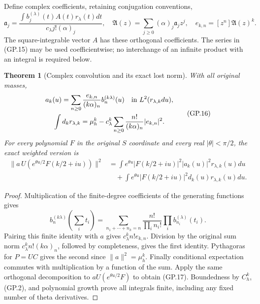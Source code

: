 \documentclass[11pt]{article}
\newtheorem{theorem}{Theorem}
\begin{document}
Define complex coefficients, retaining conjugation conventions,
\begin{equation}
 \mathfrak a_j=\frac{\int b_j^{(\lambda)}(t)A(t)r_\lambda(t)dt}
                         {c_\lambda j!(\alpha)_j},\quad
 \mathfrak A(z)=\sum_{j\geq0}(\alpha)_j\mathfrak a_jz^j,\quad
 e_{k,n}=[z^n]\mathfrak A(z)^k.
 \tag{GP.15}
\end{equation}
The square-integrable vector $A$ has these orthogonal coefficients.
The series in (GP.15) may be used coefficientwise; no interchange of
an infinite product with an integral is required below.
\begin{theorem}[Complex convolution and its exact lost norm]
With all original masses,
\begin{equation}
 \begin{gathered}
 a_k(u)=\sum_{n\geq0}\frac{e_{k,n}}{(k\alpha)_n}b_n^{(k\lambda)}(u)
       \quad\hbox{in }L^2(r_{\lambda,k}du),\\
 \int d_k r_{\lambda,k}
  =\mu_h^k-c_\lambda^k\sum_{n\geq0}
                         \frac{n!}{(k\alpha)_n}|e_{k,n}|^2.
 \end{gathered}
 \tag{GP.16}
\end{equation}
For every polynomial $F$ in the original $S$ coordinate and every
real $|\theta|<\pi/2$, the exact weighted version is
\begin{equation}
 \begin{aligned}
 \|a\,U(e^{\theta u/2}F(k/2+iu))\|^2
 &=\int e^{\theta u}|F(k/2+iu)|^2|a_k(u)|^2r_{\lambda,k}(u)du\\
 &\quad+\int e^{\theta u}|F(k/2+iu)|^2d_k(u)r_{\lambda,k}(u)du.
 \end{aligned}
 \tag{GP.17}
\end{equation}
\end{theorem}
\begin{proof}
Multiplication of the finite-degree coefficients of the generating
functions gives
\[
 b_n^{(k\lambda)}(\textstyle\sum_i t_i)
 =\sum_{n_1+\cdots+n_k=n}\frac{n!}{\prod_i n_i!}
                                \prod_i b_{n_i}^{(\lambda)}(t_i).
\]
Pairing this finite identity with $a$ gives
$c_\lambda^kn!e_{k,n}$. Division by the original sum norm
$c_\lambda^kn!(k\alpha)_n$, followed by completeness, gives the
first identity. Pythagoras for $P=UC$ gives the second since
$\|a\|^2=\mu_h^k$. Finally conditional expectation commutes with
multiplication by a function of the sum. Apply the same orthogonal
decomposition to $aU(e^{\theta u/2}F)$ to obtain (GP.17).
Boundedness by $C_h^k$, (GP.2), and polynomial growth prove all
integrals finite, including any fixed number of theta derivatives.
\end{proof}
\end{document}
